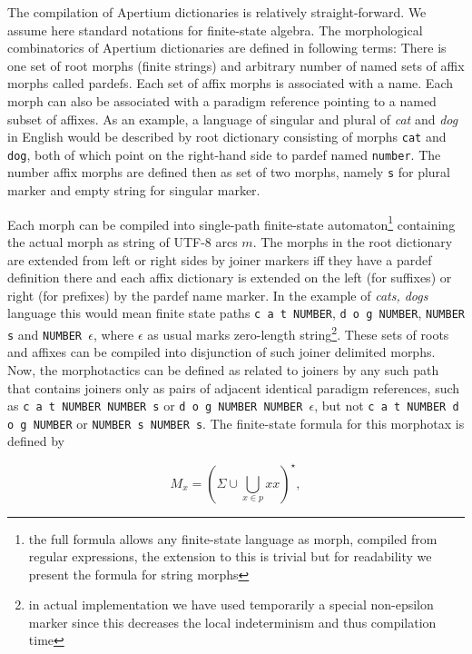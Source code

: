 \documentclass[10pt,a4paper]{article}
\begin{document}
The compilation of Apertium dictionaries is relatively straight-forward. We
assume here standard notations for finite-state algebra. The morphological
combinatorics of Apertium dictionaries are defined in following terms: There is
one set of root morphs (finite strings) and arbitrary number of named sets of
affix morphs called pardefs. Each set of affix morphs is associated with a
name. Each morph can also be associated with a paradigm reference pointing to a
named subset of affixes. As an example, a language of singular and plural of
\emph{cat} and \emph{dog} in English would be described by root dictionary
consisting of morphs \texttt{cat} and \texttt{dog}, both of which point on the
right-hand side to pardef named \texttt{number}. The number affix morphs are
defined then as set of two morphs, namely \texttt{s} for plural marker and
empty string for singular marker.

Each morph can be compiled into single-path finite-state automaton\footnote{the
full formula allows any finite-state language as morph, compiled from regular
expressions, the extension to this is trivial but for readability we present
the formula for string morphs} containing the actual morph as string of UTF-8
arcs $m$. The morphs in the root dictionary are extended from left or right
sides by joiner markers iff they have a pardef definition there and each affix
dictionary is extended on the left (for suffixes) or right (for prefixes) by
the pardef name marker. In the example of \emph{cats, dogs} language this would
mean finite state paths \texttt{c a t NUMBER}, \texttt{d o g NUMBER},
\texttt{NUMBER s} and \texttt{NUMBER $\epsilon$}, where $\epsilon$ as usual
marks zero-length string\footnote{in actual implementation we have used
temporarily a special non-epsilon marker since this decreases the local
indeterminism and thus compilation time}.  These sets of roots and affixes can
be compiled into disjunction of such joiner delimited morphs.  Now, the
morphotactics can be defined as related to joiners by any such path that
contains joiners only as pairs of adjacent identical paradigm references, such
as \texttt{c a t NUMBER NUMBER s} or \texttt{d o g NUMBER NUMBER $\epsilon$},
but not \texttt{c a t NUMBER d o g NUMBER} or \texttt{NUMBER s NUMBER s}. The
finite-state formula for this morphotax is defined by

\begin{equation}\label{formula:morphotax}
 M_x = (\Sigma \cup \bigcup_{x \in p} x x)^{\star},
\end{equation}
\end{document}
